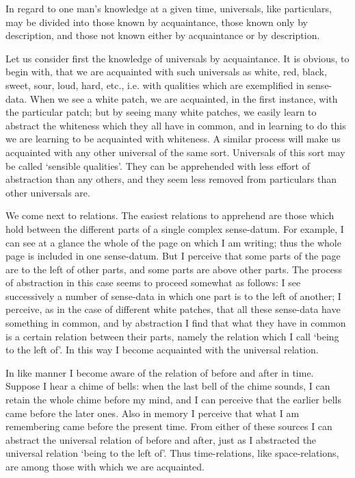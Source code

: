 \documentclass[oneside,letterpaper,12pt]{book}
\begin{document}
In regard to one man's knowledge at a given time,
universals, like particulars, may be divided into those known by
acquaintance, those known only by description, and those not known
either by acquaintance or by description.

Let us consider first the knowledge of universals by acquaintance. \label{sensible} It is
obvious, to begin with, that we are acquainted with such universals as
white, red, black, sweet, sour, loud, hard, etc., i.e. with qualities
which are exemplified in sense-data. When we see a white patch, we are
acquainted, in the first instance, with the particular patch; but by
seeing many white patches, we easily learn to abstract the whiteness
which they all have in common, and in learning to do this we are
learning to be acquainted with whiteness. A similar process will make us
acquainted with any other universal of the same sort. Universals of this
sort may be called `sensible qualities'.
\label{abstraction} They can be apprehended with less effort of abstraction than any others,
and they seem less removed from particulars than other universals are.

We come next to relations. \label{spacetime} The easiest relations to apprehend are those
which hold between the different parts of a single complex sense-datum.
For example, I can see at a glance the whole of the page on which I am
writing; thus the whole page is included in one sense-datum. But I
perceive that some parts of the page are to the left of other parts, and
some parts are above other parts. The process of abstraction in this
case seems to proceed somewhat as follows: I see successively a number
of sense-data in which one part is to the left of another; I perceive,
as in the case of different white patches, that all these sense-data
have something in common, and by abstraction I find that what they have
in common is a certain relation between their parts, namely the relation
which I call `being to the left of'. In
this way I become acquainted with the universal relation.

In like manner I become aware of the relation of before and after in
time. Suppose I hear a chime of bells: when the last bell of the chime
sounds, I can retain the whole chime before my mind, and I can perceive
that the earlier bells came before the later ones. Also in memory I
perceive that what I am remembering came before the present time. From
either of these sources I can abstract the universal relation of before
and after, just as I abstracted the universal relation
`being to the left of'. Thus
time-relations, like space-relations, are among those with which we are
acquainted.
\end{document}
